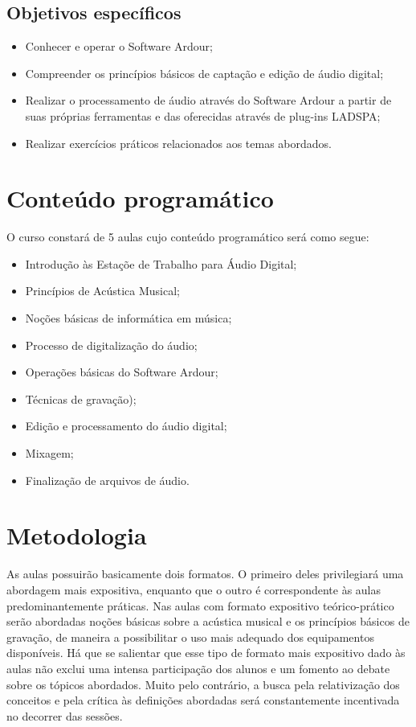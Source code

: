 \documentclass{article}
\begin{document}
\subsection{Objetivos específicos}

\begin{itemize}
\item Conhecer e operar o Software Ardour;
\item Compreender os princípios básicos de captação e edição de áudio
  digital;
\item Realizar o processamento de áudio através do Software Ardour a
  partir de suas próprias ferramentas e das oferecidas através de
  plug-ins LADSPA;
\item Realizar exercícios práticos relacionados aos temas abordados.
\end{itemize}

\section{Conteúdo programático}

O curso constará de 5 aulas cujo conteúdo programático será como segue:
\begin{itemize}
\item Introdução às Estaçõe de Trabalho para Áudio Digital;
\item Princípios de Acústica Musical;
\item Noções básicas de informática em música;
\item Processo de digitalização do áudio;
\item Operações básicas do Software Ardour;
\item Técnicas de gravação);
\item Edição e processamento do áudio digital;
\item Mixagem;
\item Finalização de arquivos de áudio.
\end{itemize}


\section{Metodologia}

As aulas possuirão basicamente dois formatos. O primeiro deles
privilegiará uma abordagem mais expositiva, enquanto que o outro é
correspondente às aulas predominantemente práticas.  Nas aulas com
formato expositivo teórico-prático serão abordadas noções básicas
sobre a acústica musical e os princípios básicos de gravação, de
maneira a possibilitar o uso mais adequado dos equipamentos
disponíveis. Há que se salientar que esse tipo de formato mais
expositivo dado às aulas não exclui uma intensa participação dos
alunos e um fomento ao debate sobre os tópicos abordados. Muito pelo
contrário, a busca pela relativização dos conceitos e pela crítica às
definições abordadas será constantemente incentivada no decorrer das
sessões.
\end{document}
